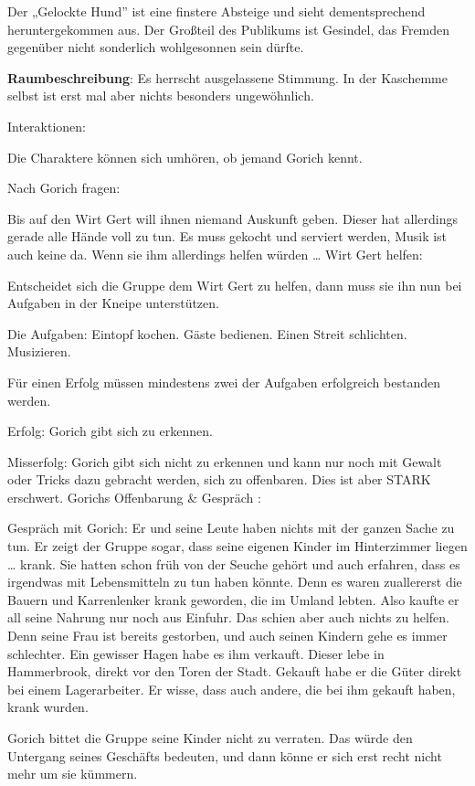 Der „Gelockte Hund” ist eine finstere Absteige und sieht dementsprechend heruntergekommen aus. Der Großteil des Publikums ist Gesindel, das Fremden gegenüber nicht sonderlich wohlgesonnen sein dürfte.

\textbf{Raumbeschreibung}: Es herrscht ausgelassene Stimmung. In der Kaschemme selbst ist erst mal aber nichts besonders ungewöhnlich.

Interaktionen:

Die Charaktere können sich umhören, ob jemand Gorich kennt.

Nach Gorich fragen:

Bis auf den Wirt Gert will ihnen niemand Auskunft geben.
Dieser hat allerdings gerade alle Hände voll zu tun.
Es muss gekocht und serviert werden, Musik ist auch keine da. Wenn sie ihm allerdings helfen würden …
Wirt Gert helfen:

Entscheidet sich die Gruppe dem Wirt Gert zu helfen, dann muss sie ihn nun bei Aufgaben in der Kneipe unterstützen.

Die Aufgaben:
Eintopf kochen.
Gäste bedienen.
Einen Streit schlichten.
Musizieren.

Für einen Erfolg müssen mindestens zwei der Aufgaben erfolgreich bestanden werden.

Erfolg:
Gorich gibt sich zu erkennen.

Misserfolg:
Gorich gibt sich nicht zu erkennen und kann nur noch mit Gewalt oder Tricks dazu gebracht werden, sich zu offenbaren. Dies ist aber STARK erschwert.
Gorichs Offenbarung \& Gespräch
:

Gespräch mit Gorich: Er und seine Leute haben nichts mit der ganzen Sache zu tun. Er zeigt der Gruppe sogar, dass seine eigenen Kinder im Hinterzimmer liegen … krank. Sie hatten schon früh von der Seuche gehört und auch erfahren, dass es irgendwas mit Lebensmitteln zu tun haben könnte. Denn es waren zuallererst die Bauern und Karrenlenker krank geworden, die im Umland lebten. Also kaufte er all seine Nahrung nur noch aus Einfuhr. Das schien aber auch nichts zu helfen. Denn seine Frau ist bereits gestorben, und auch seinen Kindern gehe es immer schlechter. Ein gewisser Hagen habe es ihm verkauft. Dieser lebe in Hammerbrook, direkt vor den Toren der Stadt. Gekauft habe er die Güter direkt bei einem Lagerarbeiter. Er wisse, dass auch andere, die bei ihm gekauft haben, krank wurden.

Gorich bittet die Gruppe seine Kinder nicht zu verraten. Das würde den Untergang seines Geschäfts bedeuten, und dann könne er sich erst recht nicht mehr um sie kümmern.

